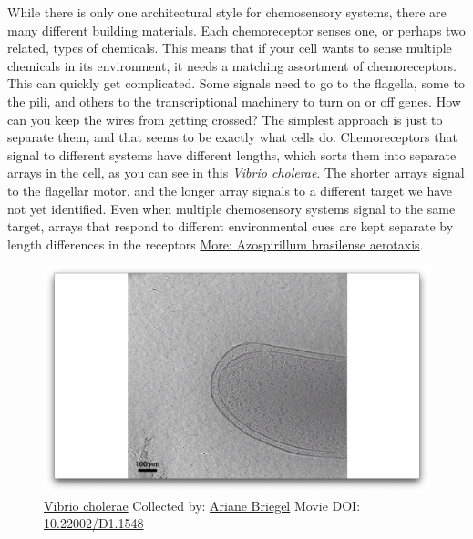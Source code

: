 \documentclass[]{tufte-book}
\begin{document}
While there is only one architectural style for chemosensory systems,
there are many different building materials. Each chemoreceptor senses
one, or perhaps two related, types of chemicals. This means that if your
cell wants to sense multiple chemicals in its environment, it needs a
matching assortment of chemoreceptors. This can quickly get complicated.
Some signals need to go to the flagella, some to the pili, and others to
the transcriptional machinery to turn on or off genes. How can you keep
the wires from getting crossed? The simplest approach is just to
separate them, and that seems to be exactly what cells do.
Chemoreceptors that signal to different systems have different lengths,
which sorts them into separate arrays in the cell, as you can see in
this \emph{Vibrio cholerae}. The shorter arrays signal to the flagellar
motor, and the longer array signals to a different target we have not
yet identified. Even when multiple chemosensory systems signal to the
same target, arrays that respond to different environmental cues are
kept separate by length differences in the receptors
\protect\hyperlink{Azospirillum_brasilense_aerotaxis}{More: Azospirillum
brasilense aerotaxis}.





\begin{figure}
\includegraphics{movie_stills/7_4} \caption[\protect\hyperlink{tree}{Vibrio cholerae} Collected by:
\protect\hyperlink{ariane_briegel}{Ariane Briegel} Movie DOI:
\href{https://doi.org/10.22002/D1.1548}{10.22002/D1.1548}]{\protect\hyperlink{tree}{Vibrio cholerae} Collected by:
\protect\hyperlink{ariane_briegel}{Ariane Briegel} Movie DOI:
\href{https://doi.org/10.22002/D1.1548}{10.22002/D1.1548}}\label{fig:7-4}
\end{figure}
\end{document}
